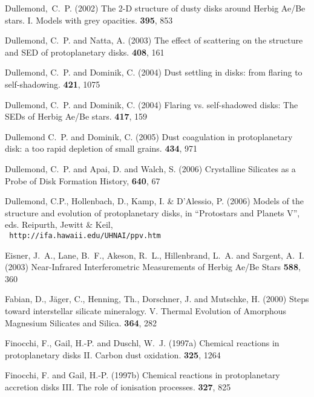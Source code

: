 \begin{literature}
\item 
Dullemond,~C.~P. (2002) The 2-D structure of dusty disks around Herbig Ae/Be
stars. I. Models with grey opacities. \aap \textbf{395}, 853

\item 
Dullemond, C.~P. and Natta, A. (2003) The effect of scattering on the
structure and SED of protoplanetary disks. \aap \textbf{408}, 161

\item 
Dullemond, C.~P. and Dominik, C. (2004) Dust settling in disks: from flaring
to self-shadowing. \aap \textbf{421}, 1075

\item 
Dullemond, C.~P. and Dominik, C. (2004) Flaring vs. self-shadowed disks: The
SEDs of Herbig Ae/Be stars. \aap \textbf{417}, 159

\item 
Dullemond C.~P. and Dominik, C. (2005) Dust coagulation in protoplanetary
disk: a too rapid depletion of small grains. \aap \textbf{434}, 971

\item {Dullemond}, C.~P. and {Apai}, D. and {Walch}, S. (2006)
  Crystalline Silicates as a Probe of Disk Formation History, 
  \apjl \textbf{640}, 67

\item Dullemond, C.P., Hollenbach, D., Kamp, I. \& D'Alessio, P. (2006)
  Models of the structure and evolution of protoplanetary disks, 
  in ``Protostars and Planets V'', eds. Reipurth, Jewitt \& Keil,\\ {\tt
  http://ifa.hawaii.edu/UHNAI/ppv.htm}

\item
Eisner, J.~A., Lane, B.~F., Akeson, R.~L., Hillenbrand, L.~A. and 
Sargent, A.~I. (2003) Near-Infrared Interferometric Measurements of 
Herbig Ae/Be Stars \apj \textbf{588}, 360

\item
Fabian, D., J\"ager, C., Henning, Th., Dorschner, J. and Mutschke, H. (2000)
Steps toward interstellar silicate mineralogy. V. Thermal Evolution of
Amorphous Magnesium Silicates and Silica. \aap \textbf{364}, 282

\item
Finocchi, F., Gail, H.-P. and Duschl, W.~J. (1997a) Chemical reactions in
protoplanetary disks II. Carbon dust oxidation. \aap \textbf{325}, 1264
 
\item
Finocchi, F. and Gail, H.-P. (1997b) Chemical reactions in protoplanetary
accretion disks III. The role of ionisation processes. \aap \textbf{327},
825


\end{literature}
